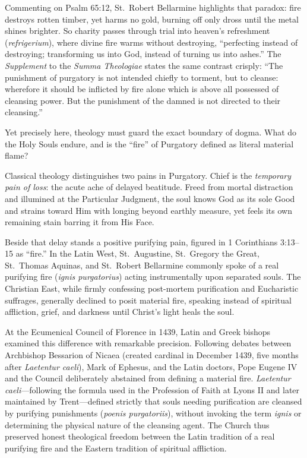 Commenting on Psalm 65:12, St.\ Robert Bellarmine highlights that paradox: fire destroys rotten timber, yet harms no gold, burning off only dross until the metal shines brighter. So charity passes through trial into heaven's refreshment (\textit{refrigerium}), where divine fire warms without destroying, ``perfecting instead of destroying; transforming us into God, instead of turning us into ashes.'' The \textit{Supplement} to the \textit{Summa Theologiae} states the same contrast crisply: ``The punishment of purgatory is not intended chiefly to torment, but to cleanse: wherefore it should be inflicted by fire alone which is above all possessed of cleansing power. But the punishment of the damned is not directed to their cleansing.''

Yet precisely here, theology must guard the exact boundary of dogma. What do the Holy Souls endure, and is the ``fire'' of Purgatory defined as literal material flame?

Classical theology distinguishes two pains in Purgatory. Chief is the \textit{temporary pain of loss}: the acute ache of delayed beatitude. Freed from mortal distraction and illumined at the Particular Judgment, the soul knows God as its sole Good and strains toward Him with longing beyond earthly measure, yet feels its own remaining stain barring it from His Face.

Beside that delay stands a positive purifying pain, figured in 1 Corinthians 3:13--15 as ``fire.'' In the Latin West, St.\ Augustine, St.\ Gregory the Great, St.\ Thomas Aquinas, and St.\ Robert Bellarmine commonly spoke of a real purifying fire (\textit{ignis purgatorius}) acting instrumentally upon separated souls. The Christian East, while firmly confessing post-mortem purification and Eucharistic suffrages, generally declined to posit material fire, speaking instead of spiritual affliction, grief, and darkness until Christ's light heals the soul.

At the Ecumenical Council of Florence in 1439, Latin and Greek bishops examined this difference with remarkable precision. Following debates between Archbishop Bessarion of Nicaea (created cardinal in December 1439, five months after \textit{Laetentur caeli}), Mark of Ephesus, and the Latin doctors, Pope Eugene IV and the Council deliberately abstained from defining a material fire. \textit{Laetentur caeli}---following the formula used in the Profession of Faith at Lyons II and later maintained by Trent---defined strictly that souls needing purification are cleansed by purifying punishments (\textit{poenis purgatoriis}), without invoking the term \textit{ignis} or determining the physical nature of the cleansing agent. The Church thus preserved honest theological freedom between the Latin tradition of a real purifying fire and the Eastern tradition of spiritual affliction.


